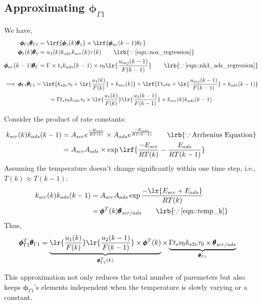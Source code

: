 \subsection{Approximating $\pmb \phi_{\Gamma 1}$}

We have,
\begin{align}
        \pmb \phi_{\Gamma 1} \pmb \theta_{\Gamma 1} &= \lrf{\pmb \phi_1 (k) \pmb \theta_1} \times \lrf{\pmb \phi_{ur}(k-1) \theta_{\Gamma}}\\
        \pmb \phi_1 (k)  \pmb \theta_{1}&= u_1(k) k_{s2v} k_{scr}(k) \tau (k) \qquad \lrb{\because \ref{eqn::nox_regression}}\\
        \pmb \phi_{ur}(k-1) \pmb \theta_{\Gamma} &= \Gamma \times t_s k_{ads}(k-1) \times \nu_0 \lr{\frac{u_{inj}(k-1)}{F(k-1)}}
        \qquad \lrb{\because \ref{eqn::nh3_ads_regression}}
\end{align}
\begin{multline}
        \implies  \pmb \phi_{\Gamma 1} \pmb \theta_{\Gamma 1} =
                \lrf{k_{s2v} \tau_0 \times \lr{\frac{u_1(k)}{F(k)}} \times k_{scr}(k)} \times
                \lrf{\Gamma t_s \nu_0 \times \lr{\frac{u_{inj}(k-1)}{F(k-1)}} \times k_{ads}(k-1)} \\
        = \Gamma t_s \nu_0 k_{s2v} \tau_0 \times \lr{\frac{u_1(k)}{F(k)}} \lr{\frac{u_2(k-1)}{F(k-1)}} \times  k_{scr}(k) k_{ads}(k-1)
\end{multline}

Consider the product of rate constants:
\begin{align*}
        k_{scr}(k) k_{ads}(k-1) &= A_{scr} e^{\frac{-E_{scr}}{R T(k)}} \times A_{ads} e^{\frac{-E_{ads}}{R T(k-1)}} \qquad \lrb{\because \text{Arrhenius Equation}}\\
        &= A_{scr}A_{ads} \times \exp \lrf{\frac{-E_{scr}}{R T(k)} - \frac{E_{ads}}{R T(k-1)}}
\end{align*}
Assuming the temperature doesn't change significantly within one time step, i.e., $T(k) \approx T(k-1)$:
\begin{align}
        k_{scr}(k) k_{ads}(k-1) &= A_{scr}A_{ads} \exp{\frac{-\lr{E_{scr}+E_{ads}}}{R T(k)}}\\
                                &= \pmb \phi^T(k) \pmb \theta_{scr/ads} \qquad \lrb{\because \ref{eqn::temp_k}}
\end{align}
Thus,
\begin{align}
        \pmb \phi_{\Gamma 1}^T \pmb \theta_{\Gamma 1} &=
        \underbrace{ \lr{\frac{u_1(k)}{F(k)}} \lr{\frac{u_2(k-1)}{F(k-1)}} \times \pmb \phi^T(k)}
        _{\pmb \phi_{\Gamma 1}^T(k)}  \times
        \underbrace{ \Gamma t_s \nu_0 k_{s2v} \tau_0 \times \pmb \theta_{scr/ads}}
        _{\pmb \theta_{\Gamma 1}}
\end{align}

This approximation not only reduces  the total number of paremeters but also keeps $\pmb \phi_{\Gamma 1}$'s elements independent when the temperature is slowly varying or a constant.
